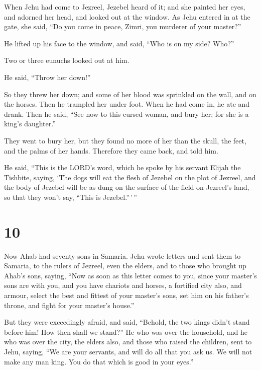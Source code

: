  When Jehu had come to Jezreel, Jezebel heard of it; and
she painted her eyes, and adorned her head, and looked out at the
window.  As Jehu entered in at the gate, she said, ``Do you
come in peace, Zimri, you murderer of your master?''

 He lifted up his face to the window, and said, ``Who is on
my side? Who?''

Two or three eunuchs looked out at him.

 He said, ``Throw her down!''

So they threw her down; and some of her blood was sprinkled on the wall,
and on the horses. Then he trampled her under foot.  When
he had come in, he ate and drank. Then he said, ``See now to this cursed
woman, and bury her; for she is a king's daughter.''

 They went to bury her, but they found no more of her than
the skull, the feet, and the palms of her hands.  Therefore
they came back, and told him.

He said, ``This is the LORD's word, which he spoke by his servant Elijah
the Tishbite, saying, `The dogs will eat the flesh of Jezebel on the
plot of Jezreel,  and the body of Jezebel will be as dung
on the surface of the field on Jezreel's land, so that they won't say,
``This is Jezebel.''\,'\,''

\hypertarget{section-9}{%
\section{10}\label{section-9}}

 Now Ahab had seventy sons in Samaria. Jehu wrote letters
and sent them to Samaria, to the rulers of Jezreel, even the elders, and
to those who brought up Ahab's sons, saying,  ``Now as soon
as this letter comes to you, since your master's sons are with you, and
you have chariots and horses, a fortified city also, and armour,
 select the best and fittest of your master's sons, set him
on his father's throne, and fight for your master's house.''

 But they were exceedingly afraid, and said, ``Behold, the
two kings didn't stand before him! How then shall we stand?''
 He who was over the household, and he who was over the
city, the elders also, and those who raised the children, sent to Jehu,
saying, ``We are your servants, and will do all that you ask us. We will
not make any man king. You do that which is good in your eyes.''

